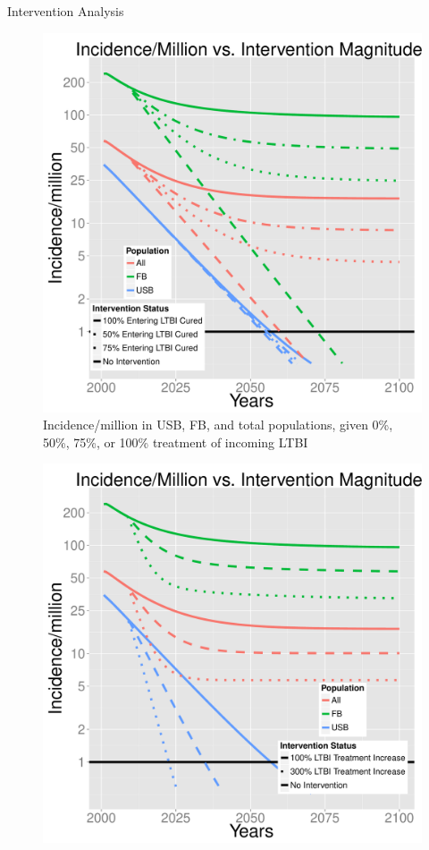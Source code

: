 \documentclass[final]{beamer}
\begin{document}
\begin{frame}
\begin{columns}[T]
\begin{column}{.3\textwidth}
      \begin{block}{Intervention Analysis}
        \begin{figure}[h]
          \begin{minipage}[c]{0.6\textwidth}
            \includegraphics[height=0.7\textwidth,width=\textwidth]{redEnLTBIIncGrouped}
          \end{minipage}
          \hspace{0.5em}
          \begin{minipage}[c]{0.35\textwidth}
            \caption{Incidence/million in USB, FB, and total populations,
                     given 0\%, 50\%, 75\%, or 100\% treatment of incoming
                     LTBI}
          \end{minipage}
          \label{fig:redEnLTBI_incidence}
        \end{figure}
        \begin{figure}[h]
          \begin{minipage}[c]{0.6\textwidth}
            \includegraphics[height=0.7\textwidth,width=\textwidth]{incLTBItrmtIncGrouped}

\end{minipage}
\end{figure}
\end{block}
\end{column}
\end{columns}
\end{frame}
\end{document}
